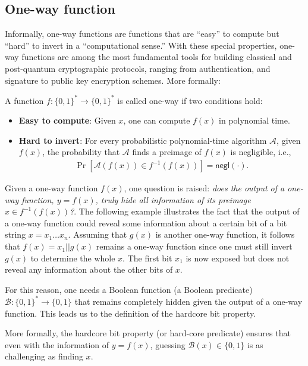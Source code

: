 \documentclass[cryptography,review,submit,pdftex,moreauthors,amsmath,amssymb,aps,strict]{Definitions/mdpi}
\begin{document}
\subsection{One-way function}
Informally, one-way functions are functions that are ``easy'' to compute but ``hard'' to invert in a ``computational sense.'' With these special properties, one-way functions are among the most fundamental tools for building classical and post-quantum cryptographic protocols, ranging from authentication, and signature to public key encryption schemes. More formally:

\begin{Definition}
    A function $f:\{0,1\}^* \to \{0,1\}^*$ is called one-way if two conditions hold:
    \begin{itemize}
        \item \textbf{Easy to compute}: Given $x$, one can compute $f(x)$ in polynomial time.
        \item \textbf{Hard to invert}: For every probabilistic polynomial-time algorithm $\mathcal{A}$, given $f(x)$, the probability that $\mathcal{A}$ finds a preimage of $f(x)$ is negligible, i.e.,
        \begin{align}
            \Pr[\mathcal{A}(f(x)) \in f^{-1}(f(x))] = \mathsf{negl}(\cdot).
        \end{align}
    \end{itemize}
\end{Definition}

Given a one-way function $f(x)$, one question is raised: \textit{does the output of a one-way function, $y=f(x)$, truly hide all information of its preimage $x\in f^{-1}(f(x))$?}. The following example illustrates the fact that the output of a one-way function could reveal some information about a certain bit of a bit string $x=x_1\dots x_n$. Assuming that $g(x)$ is another one-way function, it follows that $f(x) = x_1||g(x)$ remains a one-way function since one must still invert $g(x)$ to determine the whole $x$. The first bit $x_1$ is now exposed but does not reveal any information about the other bits of $x$.

For this reason, one needs a Boolean function (a Boolean predicate) $\mathcal{B}:\{0,1\}^*\to\{0,1\}$ that remains completely hidden given the output of a one-way function. This leads us to the definition of the hardcore bit property.

\noindent More formally, the hardcore bit property (or hard-core predicate) ensures that even with the information of $y=f(x)$, guessing $\mathcal{B}(x)\in\{0,1\}$ is as challenging as finding $x$. 
\end{document}
